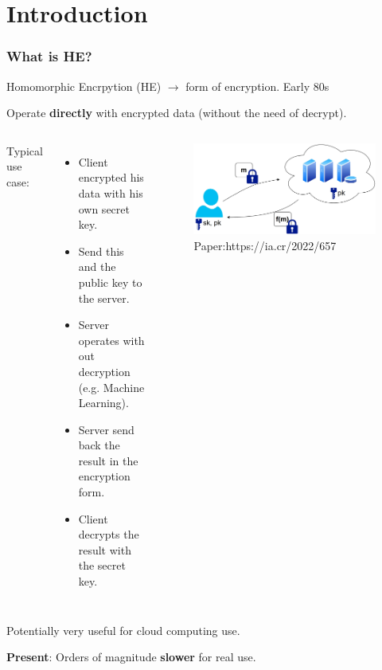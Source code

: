 \documentclass[10pt,handout]{beamer}
\begin{document}

\section{Introduction}
\begin{frame}
\frametitle{What is HE?}


    Homomorphic Encrpytion (HE) $\rightarrow$ form of encryption. Early 80s
\vspace{-0.3cm}

    Operate \textbf{directly} with encrypted data (without the need of decrypt).
\vspace{0.3cm}
  \begin{columns}
Typical use case:
\begin{itemize}
    \item Client encrypted his data with his own secret key.
    \item Send this and the public key to the server.
    \item Server operates with out decryption (e.g. Machine Learning).
    \item Server send back the result in the encryption form.
    \item Client decrypts the result with the secret key.
\end{itemize}



\begin{figure}[h!]
    \centering
    \includegraphics[scale=0.1]{fhe.jpg}
    \caption{Paper:https://ia.cr/2022/657}
\end{figure}
\end{columns}
 \vspace{-0.3cm}


Potentially very useful for cloud computing use.
 \vspace{-0.3cm}

 \pause
    \textbf{Present}: Orders of magnitude \textbf{slower} for real use.


\end{frame}
\end{document}
